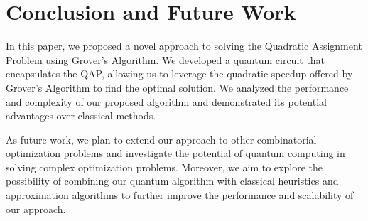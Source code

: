 \section{Conclusion and Future Work}\label{sec:conclusion}

In this paper, we proposed a novel approach to solving the Quadratic Assignment Problem using Grover's Algorithm. We developed a quantum circuit that encapsulates the QAP, allowing us to leverage the quadratic speedup offered by Grover's Algorithm to find the optimal solution. We analyzed the performance and complexity of our proposed algorithm and demonstrated its potential advantages over classical methods.

As future work, we plan to extend our approach to other combinatorial optimization problems and investigate the potential of quantum computing in solving complex optimization problems. Moreover, we aim to explore the possibility of combining our quantum algorithm with classical heuristics and approximation algorithms to further improve the performance and scalability of our approach.

